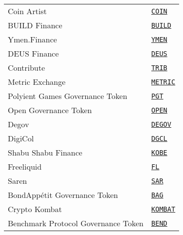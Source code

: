 \begin{tabular}{ll}
Coin Artist & \href{https://etherscan.io/address/0x87b008E57F640D94Ee44Fd893F0323AF933F9195}{\tt COIN} \\
BUILD Finance & \href{https://etherscan.io/address/0x6e36556b3ee5aa28def2a8ec3dae30ec2b208739}{\tt BUILD} \\
Ymen.Finance & \href{https://etherscan.io/address/0xd0c59798f986d333554688cd667033d469c2398e}{\tt YMEN} \\
DEUS Finance & \href{https://etherscan.io/address/0x3b62F3820e0B035cc4aD602dECe6d796BC325325}{\tt DEUS} \\
Contribute & \href{https://etherscan.io/address/0xe09216f1d343dd39d6aa732a08036fee48555af0}{\tt TRIB} \\
Metric Exchange & \href{https://etherscan.io/address/0xefc1c73a3d8728dc4cf2a18ac5705fe93e5914ac}{\tt METRIC} \\
Polyient Games Governance Token & \href{https://etherscan.io/address/0xeaccb6E0f24d66cF4Aa6cBDa33971b9231d332a1}{\tt PGT} \\
Open Governance Token & \href{https://etherscan.io/address/0x69e8b9528CABDA89fe846C67675B5D73d463a916}{\tt OPEN} \\
Degov & \href{https://etherscan.io/address/0x469E66e06fEc34839E5eB1273ba85A119B8D702F}{\tt DEGOV} \\
DigiCol & \href{https://etherscan.io/address/0x63B8b7d4A3EFD0735c4BFFBD95B332a55e4eB851}{\tt DGCL} \\
Shabu Shabu Finance & \href{https://etherscan.io/address/0xCb4e8CafEDa995da5cEdfda5205BD5664a12b848}{\tt KOBE} \\
Freeliquid & \href{https://etherscan.io/address/0xfFED56a180f23fD32Bc6A1d8d3c09c283aB594A8}{\tt FL} \\
Saren & \href{https://etherscan.io/address/0xbd4a858139b155219e2c8d10135003fdef720b6b}{\tt SAR} \\
BondAppétit Governance Token & \href{https://etherscan.io/address/0x28A06c02287e657ec3F8e151A13C36A1D43814b0}{\tt BAG} \\
Crypto Kombat & \href{https://etherscan.io/address/0x878cf148ccbb50426043a9affe54ba408221c7fa}{\tt KOMBAT} \\
Benchmark Protocol Governance Token & \href{https://etherscan.io/address/0xe0d8ed14cf46b5c12721df75460cb24495d01af3}{\tt BEND} \\
\bottomrule
\end{tabular}
